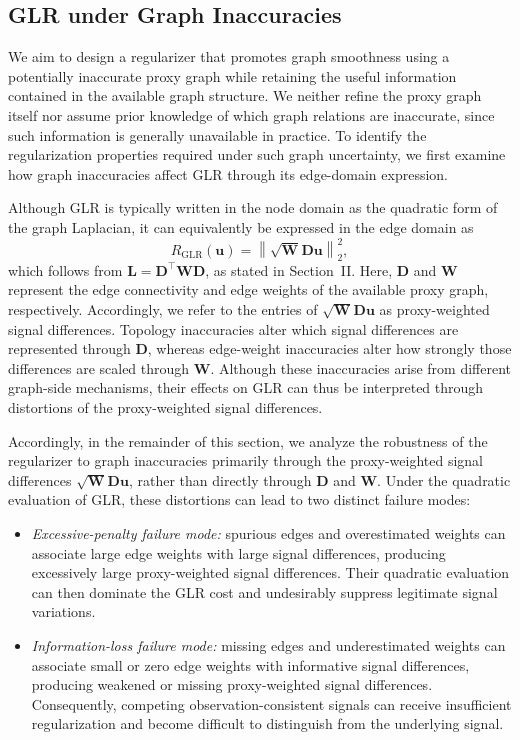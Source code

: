 \subsection{GLR under Graph Inaccuracies}
\label{subsec:problem-framing}

We aim to design a regularizer that promotes graph smoothness using a potentially inaccurate proxy graph while retaining the useful information contained in the available graph structure.
We neither refine the proxy graph itself nor assume prior knowledge of which graph relations are inaccurate, since such information is generally unavailable in practice.
To identify the regularization properties required under such graph uncertainty, we first examine how graph inaccuracies affect GLR through its edge-domain expression.

Although GLR is typically written in the node domain as the quadratic form of the graph Laplacian, it can equivalently be expressed in the edge domain as
\begin{equation}
R_{\mathrm{GLR}}(\mathbf{u})
=
\left\|
\sqrt{\mathbf{W}}\mathbf{D}\mathbf{u}
\right\|_2^2,
\label{eq:glr-edge-domain}
\end{equation}
which follows from $\mathbf{L}=\mathbf{D}^{\top}\mathbf{W}\mathbf{D}$, as stated in Section~II.
Here, $\mathbf{D}$ and $\mathbf{W}$ represent the edge connectivity and edge weights of the available proxy graph, respectively.
Accordingly, we refer to the entries of $\sqrt{\mathbf{W}}\mathbf{D}\mathbf{u}$ as proxy-weighted signal differences.
Topology inaccuracies alter which signal differences are represented through $\mathbf{D}$, whereas edge-weight inaccuracies alter how strongly those differences are scaled through $\mathbf{W}$.
Although these inaccuracies arise from different graph-side mechanisms, their effects on GLR can thus be interpreted through distortions of the proxy-weighted signal differences.

Accordingly, in the remainder of this section, we analyze the robustness of the regularizer to graph inaccuracies primarily through the proxy-weighted signal differences $\sqrt{\mathbf{W}}\mathbf{D}\mathbf{u}$, rather than directly through $\mathbf{D}$ and $\mathbf{W}$.
Under the quadratic evaluation of GLR, these distortions can lead to two distinct failure modes:
\begin{itemize}
    \item \emph{Excessive-penalty failure mode:}
    spurious edges and overestimated weights can associate large edge weights with large signal differences, producing excessively large proxy-weighted signal differences.
    Their quadratic evaluation can then dominate the GLR cost and undesirably suppress legitimate signal variations.

    \item \emph{Information-loss failure mode:}
    missing edges and underestimated weights can associate small or zero edge weights with informative signal differences, producing weakened or missing proxy-weighted signal differences.
    Consequently, competing observation-consistent signals can receive insufficient regularization and become difficult to distinguish from the underlying signal.
\end{itemize}

